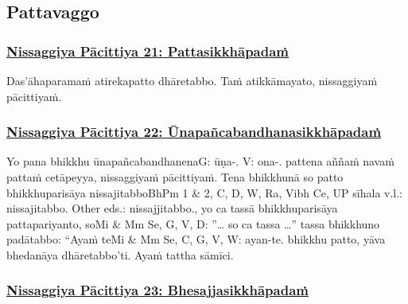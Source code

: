 \subsection{Pattavaggo}

\subsubsection*{\hyperref[forf-exp21]{Nissaggiya Pācittiya 21: Pattasikkhāpadaṁ}}
\label{np21}

Das'āhaparamaṁ atirekapatto dhāretabbo. Taṁ atikkāmayato, nissaggiyaṁ pācittiyaṁ.



\subsubsection*{\hyperref[forf-exp22]{Nissaggiya Pācittiya 22: Ūnapañcabandhanasikkhāpadaṁ}}
\label{np22}

Yo pana bhikkhu ūnapañcabandhanena\makeatletter\hyperlink{endnote-appendix}\makeatother G: ūṇa-. V: ona-. pattena aññaṁ navaṁ pattaṁ cetāpeyya, nissaggiyaṁ pācittiyaṁ. Tena bhikkhunā so patto bhikkhuparisāya nissajitabbo\makeatletter\hyperlink{endnote-appendix}\makeatother BhPm 1 & 2, C, D, W, Ra, Vibh Ce, UP sīhala v.l.: nissajitabbo. Other eds.: nissajjitabbo., yo ca tassā bhikkhuparisāya pattapariyanto, so\makeatletter\hyperlink{endnote-appendix}\makeatother Mi & Mm Se, G, V, D: ”… so ca tassa …” tassa bhikkhuno padātabbo: ``Ayaṁ te\makeatletter\hyperlink{endnote-appendix}\makeatother Mi & Mm Se, C, G, V, W: ayan-te. bhikkhu patto, yāva bhedanāya dhāretabbo'ti. Ayaṁ tattha sāmīci.



\subsubsection*{\hyperref[forf-exp23]{Nissaggiya Pācittiya 23: Bhesajjasikkhāpadaṁ}}
\label{np23}


